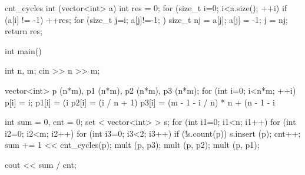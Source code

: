 cnt_cycles int (vector<int> a) {
int res = 0;
for (size_t i=0; i<a.size(); ++i)
if (a[i] != -1) {
++res;
for (size_t j=i; a[j]!=-1; ) {
size_t nj = a[j];
a[j] = -1;
j = nj;
}
}
return res;
}

int main() {
int n, m;
cin >> n >> m;

vector<int> p (n*m), p1 (n*m), p2 (n*m), p3 (n*m);
for (int i=0; i<n*m; ++i) {
p[i] = i;
p1[i] = (i %
p2[i] = (i / n + 1) %
p3[i] = (m - 1 - i / n) * n + (n - 1 - i %
}

int sum = 0, cnt = 0;
set < vector<int> > s;
for (int i1=0; i1<n; i1++) {
for (int i2=0; i2<m; i2++) {
for (int i3=0; i3<2; i3++) {
if (!s.count(p)) {
s.insert (p);
cnt++;
sum += 1 << cnt_cycles(p);
}
mult (p, p3);
}
mult (p, p2);
}
mult (p, p1);
}

cout << sum / cnt;
}
\endcode